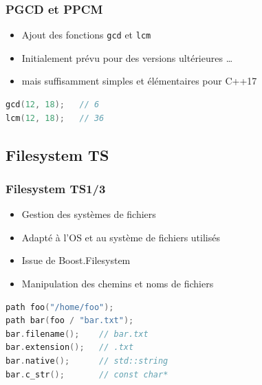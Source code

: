 \documentclass[C++.tex]{subfiles}
\begin{document}
\begin{frame}[fragile]
	\frametitle{PGCD et PPCM}
	\begin{itemize}
		\item Ajout des fonctions \lstinline|gcd| et \lstinline|lcm|
		\item Initialement prévu pour des versions ultérieures \ldots
		\item mais suffisamment simples et élémentaires pour C++17 
	\end{itemize}

	\begin{lstlisting}[language=C++]
gcd(12, 18);   // 6
lcm(12, 18);   // 36\end{lstlisting}
\end{frame}

\subsection*{Filesystem TS}
\begin{frame}[fragile]
	\frametitle{Filesystem TS\titlehfill{}1/3}
	\begin{itemize}
		\item Gestion des systèmes de fichiers
		\item Adapté à l'OS et au système de fichiers utilisés
		\item Issue de Boost.Filesystem
		\item Manipulation des chemins et noms de fichiers
	\end{itemize}

	\begin{lstlisting}[language=C++]
path foo("/home/foo");
path bar(foo / "bar.txt");
bar.filename();    // bar.txt
bar.extension();   // .txt
bar.native();      // std::string
bar.c_str();       // const char*\end{lstlisting}
\end{frame}
\end{document}
